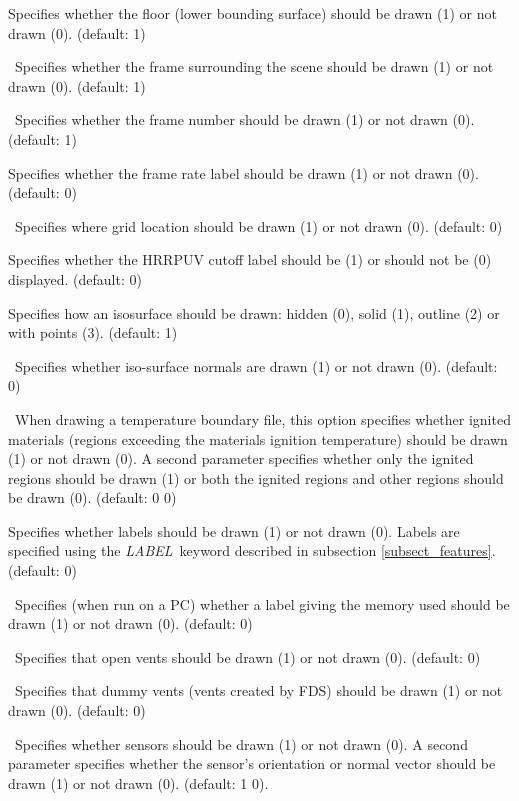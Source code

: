 \documentclass[11pt,twoside]{book}
\begin{document}
{Specifies whether
the floor (lower bounding surface) should be drawn (1) or not drawn
(0).
(default: 1)

\ Specifies whether the frame surrounding
the scene should be drawn (1) or not drawn (0). (default:
1)

\ Specifies whether the frame number
should be drawn (1) or not drawn (0). (default: 1)

Specifies whether
the frame rate label should be drawn (1) or not drawn (0).
(default: 0)

\ Specifies where grid location should be drawn (1) or not
drawn (0). (default: 0)

Specifies whether the HRRPUV cutoff label should be (1)
or should not be (0) displayed. (default: 0)

Specifies how an isosurface should be drawn: hidden (0),
solid (1), outline (2) or with points (3).  (default: 1)

\ Specifies whether iso-surface normals are drawn
(1) or not drawn (0).  (default: 0)

\ When drawing a temperature boundary file, this option
specifies whether ignited materials (regions exceeding the materials
ignition temperature) should be drawn (1) or not drawn (0).
A second parameter specifies whether only the ignited regions
should be drawn (1) or both the ignited regions and other regions should be drawn (0).
(default: 0 0)


Specifies whether labels should be drawn (1) or
not drawn (0).  Labels are specified using the {\em LABEL}\
keyword described in subsection \ref{subsect_features}. (default:
0)

\ Specifies (when run on a PC) whether a label
giving the memory used should be drawn (1) or not drawn (0).
(default: 0)

\ Specifies that open vents should be drawn
(1) or not drawn (0).  (default: 0)

\ Specifies that dummy vents (vents created
by FDS) should be drawn (1) or not drawn (0).  (default: 0)

\ Specifies whether sensors should be drawn (1) or not drawn (0).
A second parameter specifies whether the sensor's orientation or normal vector
should be drawn (1) or not drawn (0). (default: 1 0).

}
\end{document}

